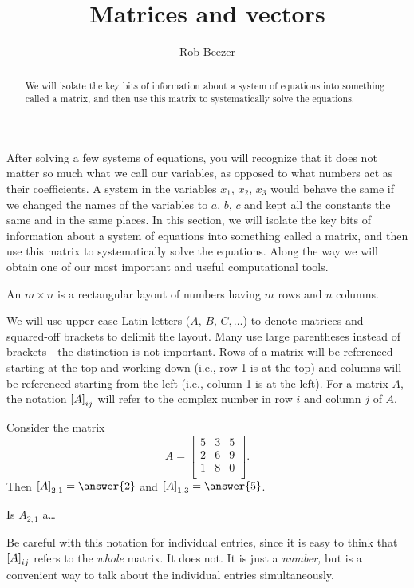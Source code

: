 \documentclass{ximera}
\author{Rob Beezer}
\title{Matrices and vectors}
\begin{document}
\begin{abstract}
  We will isolate the key bits of information about a system of
  equations into something called a matrix, and then use this matrix
  to systematically solve the equations.
\end{abstract}
\maketitle

After solving a few systems of equations, you will recognize that it does not matter so much what we call our variables, as opposed to what numbers act as their coefficients.  A system in the variables $x_1,\,x_2,\,x_3$  would behave the same if we changed the names of the variables to $a,\,b,\,c$ and kept all the constants the same and in the same places.  In this section, we will isolate the key bits of information about a system of equations into something called a matrix, and then use this matrix to systematically solve the equations.  Along the way we will obtain one of our most important and useful computational tools.


\begin{definition}
  An $m\times n$  is a rectangular layout of numbers having $m$ rows and $n$ columns.
\end{definition}

We will use upper-case Latin letters ($A,\,B,\,C,\dotsc$) to denote
matrices and squared-off brackets to delimit the layout.  Many use
large parentheses instead of brackets---the distinction is not
important.  Rows of a matrix will be referenced starting at the top
and working down (i.e., row 1 is at the top) and columns will be
referenced starting from the left (i.e., column 1 is at the left).
For a matrix $A$, the notation $\left\lbrack A\right\rbrack_{ij}$ will refer to the
complex number in row $i$ and column $j$ of $A$.

\begin{exercise}
  Consider the matrix
  \[
    A = \begin{bmatrix}
      5 & 3 & 5 \\
      2 & 6 & 9 \\
      1 & 8 & 0 \\
    \end{bmatrix}.
  \]
  Then $\matrixentry{A}{2,1} = \answer{2}$ and $\matrixentry{A}{1,3} = \answer{5}$.
\end{exercise}

\begin{question}
  Is $A_{2,1}$ a\ldots
  \begin{multipleChoice}
  \end{multipleChoice}
  
  \begin{feedback}
    Be careful with this notation for individual entries, since
    it is easy to think that $\left\lbrack A\right\rbrack_{ij}$ refers to the
    \emph{whole} matrix.  It does not.  It is just a
    \emph{number,} but is a convenient way to talk about the
    individual entries simultaneously.
  \end{feedback}
\end{question}
\end{document}
